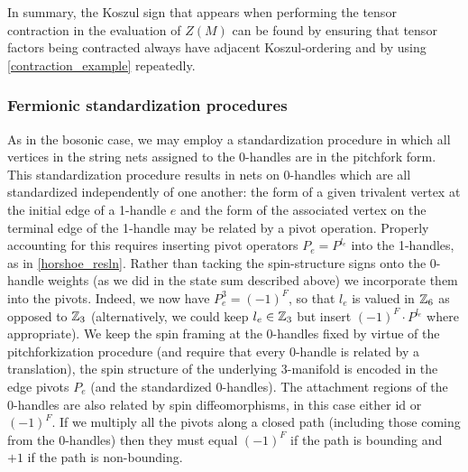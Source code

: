 In summary, the Koszul sign that appears when performing the tensor contraction in the evaluation of $Z(M)$ can be found 
by ensuring that tensor factors 
being contracted always have adjacent Koszul-ordering and by using \eqref{contraction_example} repeatedly.



\subsubsection{Fermionic standardization procedures}

As in the bosonic case, we may employ a standardization 
procedure in which all vertices in the string nets assigned to the 0-handles are in the pitchfork form.
This standardization procedure results in nets on 0-handles which are all standardized independently of one another: 
the form of a given trivalent vertex at the initial edge of a 1-handle $e$
and the form of the associated vertex on the terminal edge of the 1-handle may be related by a pivot operation.
Properly accounting for this requires inserting pivot operators $P_e=P^{l_e}$ into the 
1-handles, as in \eqref{horshoe_resln}. 
Rather than tacking the spin-structure signs onto the 0-handle weights 
(as we did in the state sum described above) we incorporate them into the pivots.
Indeed, we now have $P_e^3=(-1)^F$, so that $l_e$ is 
valued in $\mathbb{Z}_6$ as opposed to $\mathbb{Z}_3$ (alternatively, we could keep $l_e \in \mathbb{Z}_3$  but insert $(-1)^{F} \cdot P^{l_e}$ where appropriate).
We keep the spin framing at the 0-handles fixed by virtue of the pitchforkization procedure (and require that every 0-handle is related by a translation), 
the spin structure of the underlying 3-manifold is encoded in the edge pivots $P_e$ (and the standardized 0-handles).
The attachment regions of the 0-handles are also related by spin diffeomorphisms, 
in this case either $\text{id}$ or $(-1)^F$. 
If we multiply all the pivots along a closed path (including those coming from the 0-handles) then they must equal $(-1)^F$ if the 
path is bounding and $+1$ if the path is non-bounding.

